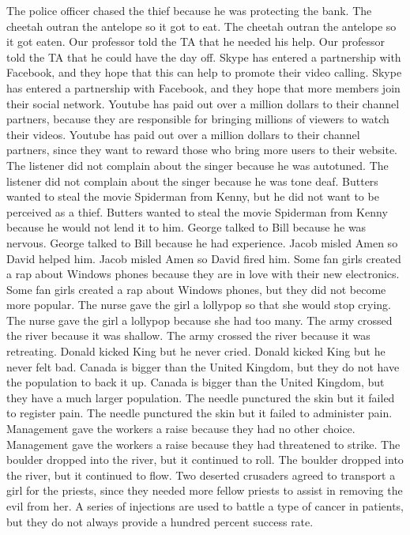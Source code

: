 \documentclass{article}
\begin{document}
\begin{enumerate}
	The police officer chased the thief because he was protecting the bank.
	The cheetah outran the antelope so it got to eat.
	The cheetah outran the antelope so it got eaten.
	Our professor told the TA that he needed his help.
	Our professor told the TA that he could have the day off.
	Skype has entered a partnership with Facebook, and they hope that this can help to promote their video calling.
	Skype has entered a partnership with Facebook, and they hope that more members join their social network.
	Youtube has paid out over a million dollars to their channel partners, because they are responsible for bringing millions of viewers to watch their videos.
	Youtube has paid out over a million dollars to their channel partners, since they want to reward those who bring more users to their website.
	The listener did not complain about the singer because he was autotuned.
	The listener did not complain about the singer because he was tone deaf.
	Butters wanted to steal the movie Spiderman from Kenny, but he did not want to be perceived as a thief.
	Butters wanted to steal the movie Spiderman from Kenny because he would not lend it to him.
	George talked to Bill because he was nervous.
	George talked to Bill because he had experience.
	Jacob misled Amen so David helped him.
	Jacob misled Amen so David fired him.
	Some fan girls created a rap about Windows phones because they are in love with their new electronics.
	Some fan girls created a rap about Windows phones, but they did not become more popular.
	The nurse gave the girl a lollypop so that she would stop crying.
	The nurse gave the girl a lollypop because she had too many.
	The army crossed the river because it was shallow.
	The army crossed the river because it was retreating.
	Donald kicked King but he never cried.
	Donald kicked King but he never felt bad.
	Canada is bigger than the United Kingdom, but they do not have the population to back it up.
	Canada is bigger than the United Kingdom, but they have a much larger population.
	The needle punctured the skin but it failed to register pain.
	The needle punctured the skin but it failed to administer pain.
	Management gave the workers a raise because they had no other choice.
	Management gave the workers a raise because they had threatened to strike.
	The boulder dropped into the river, but it continued to roll.
	The boulder dropped into the river, but it continued to flow.
	Two deserted crusaders agreed to transport a girl for the priests, since they needed more fellow priests to assist in removing the evil from her.
	A series of injections are used to battle a type of cancer in patients, but they do not always provide a hundred percent success rate.

\end{enumerate}
\end{document}
